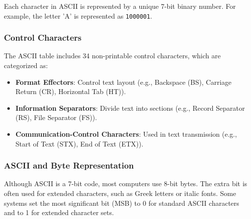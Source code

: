 \documentclass[a4paper,12pt]{article}
\begin{document}
Each character in ASCII is represented by a unique 7-bit binary number. For example, the letter 'A' is represented as \texttt{1000001}.

\subsubsection{Control Characters}
The ASCII table includes 34 non-printable control characters, which are categorized as:
\begin{itemize}
    \item \textbf{Format Effectors}: Control text layout (e.g., Backspace (BS), Carriage Return (CR), Horizontal Tab (HT)).
    \item \textbf{Information Separators}: Divide text into sections (e.g., Record Separator (RS), File Separator (FS)).
    \item \textbf{Communication-Control Characters}: Used in text transmission (e.g., Start of Text (STX), End of Text (ETX)).
\end{itemize}

\subsubsection{ASCII and Byte Representation}
Although ASCII is a 7-bit code, most computers use 8-bit bytes. The extra bit is often used for extended characters, such as Greek letters or italic fonts. Some systems set the most significant bit (MSB) to 0 for standard ASCII characters and to 1 for extended character sets.
\end{document}
